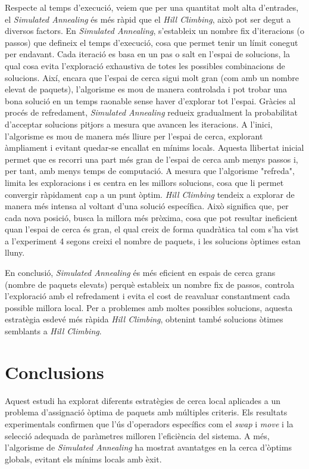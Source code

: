 \documentclass[a4paper]{article}
\begin{document}
	Respecte al temps d'execució, veiem que per una quantitat molt alta d'entrades, el \textit{Simulated Annealing} és més ràpid que el \textit{Hill Climbing}, això pot ser degut a diversos factors. En \textit{Simulated Annealing}, s'estableix un nombre fix d'iteracions (o passos) que defineix el temps d'execució, cosa que permet tenir un límit conegut per endavant. Cada iteració es basa en un pas o salt en l'espai de solucions, la qual cosa evita l'exploració exhaustiva de totes les possibles combinacions de solucions. Així, encara que l'espai de cerca sigui molt gran (com amb un nombre elevat de paquets), l'algorisme es mou de manera controlada i pot trobar una bona solució en un temps raonable sense haver d'explorar tot l'espai.
	Gràcies al procés de refredament, \textit{Simulated Annealing} redueix gradualment la probabilitat d'acceptar solucions pitjors a mesura que avancen les iteracions. A l'inici, l'algorisme es mou de manera més lliure per l'espai de cerca, explorant àmpliament i evitant quedar-se encallat en mínims locals. Aquesta llibertat inicial permet que es recorri una part més gran de l'espai de cerca amb menys passos i, per tant, amb menys temps de computació. A mesura que l'algorisme "refreda", limita les exploracions i es centra en les millors solucions, cosa que li permet convergir ràpidament cap a un punt òptim.
	\textit{Hill Climbing} tendeix a explorar de manera més intensa al voltant d'una solució específica. Això significa que, per cada nova posició, busca la millora més pròxima, cosa que pot resultar ineficient quan l'espai de cerca és gran, el qual creix de forma quadràtica tal com s'ha vist a l'experiment 4 segons creixi el nombre de paquets, i les solucions òptimes estan lluny.   

	
	En conclusió, \textit{Simulated Annealing} és més eficient en espais de cerca grans (nombre de paquets elevats) perquè estableix un nombre fix de passos, controla l'exploració amb el refredament i evita el cost de reavaluar constantment cada possible millora local. Per a problemes amb moltes possibles solucions, aquesta estratègia esdevé més ràpida \textit{Hill Climbing}, obtenint també solucions òtimes semblants a \textit{Hill Climbing}.
	
	\newpage
	\section{Conclusions}
	
	Aquest estudi ha explorat diferents estratègies de cerca local aplicades a un problema d'assignació òptima de paquets amb múltiples criteris. Els resultats experimentals confirmen que l'ús d'operadors específics com el \textit{swap} i \textit{move} i la selecció adequada de paràmetres milloren l'eficiència del sistema. A més, l'algorisme de \textit{Simulated Annealing} ha mostrat avantatges en la cerca d'òptims globals, evitant els mínims locals amb èxit. \\
	
\end{document}
